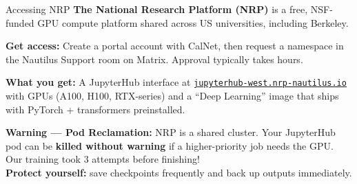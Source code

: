 \documentclass[aspectratio=169]{beamer}
\begin{document}
\begin{frame}{Accessing NRP}
    \hypertarget{nrp-access}{}
    \textbf{The National Research Platform (NRP)} is a free, NSF-funded GPU compute platform shared across US universities, including Berkeley.

    \vspace{0.5em}
    \textbf{Get access:} Create a portal account with CalNet, then request a namespace in the Nautilus Support room on Matrix. Approval typically takes hours.

    \vspace{0.5em}
    \textbf{What you get:} A JupyterHub interface at \href{https://jupyterhub-west.nrp-nautilus.io}{\texttt{jupyterhub-west.nrp-nautilus.io}} with GPUs (A100, H100, RTX-series) and a ``Deep Learning'' image that ships with PyTorch + transformers preinstalled.

    \vspace{0.5em}
    \begin{tcolorbox}[colback=red!5, colframe=red!40, boxrule=0.5pt, arc=2pt, fontupper=\small]
        \textbf{Warning --- Pod Reclamation:} NRP is a shared cluster. Your JupyterHub pod can be \textbf{killed without warning} if a higher-priority job needs the GPU. Our training took 3 attempts before finishing!\\[0.3em]
        \textbf{Protect yourself:} save checkpoints frequently and back up outputs immediately.
    \end{tcolorbox}

    \vspace{0.3em}
    \hfill\hyperlink{nrp-onboarding}{}
\end{frame}
\end{document}
